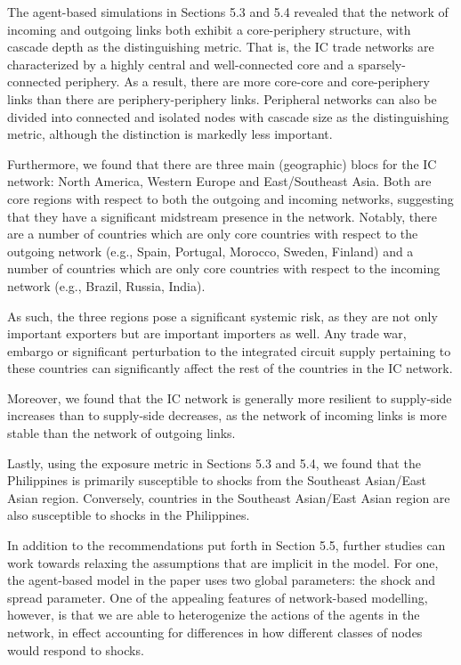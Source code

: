 \documentclass[12pt,letterpaper]{report}
\begin{document}
The agent-based simulations in Sections 5.3 and 5.4 revealed that the network of incoming and outgoing links both exhibit a core-periphery structure, with cascade depth as the distinguishing metric. That is, the IC trade networks are characterized by a highly central and well-connected core and a sparsely-connected periphery. As a result, there are more core-core and core-periphery links than there are periphery-periphery links. Peripheral networks can also be divided into connected and isolated nodes with cascade size as the distinguishing metric, although the distinction is markedly less important.

Furthermore, we found that there are three main (geographic) blocs for the IC network: North America, Western Europe and East/Southeast Asia. Both are core regions with respect to both the outgoing and incoming networks, suggesting that they have a significant midstream presence in the network. Notably, there are a number of countries which are only core countries with respect to the outgoing network (e.g., Spain, Portugal, Morocco, Sweden, Finland) and a number of countries which are only core countries with respect to the incoming network (e.g., Brazil, Russia, India).

As such, the three regions pose a significant systemic risk, as they are not only important exporters but are important importers as well. Any trade war, embargo or significant perturbation to the integrated circuit supply pertaining to these countries can significantly affect the rest of the countries in the IC network. 

Moreover, we found that the IC network is generally more resilient to supply-side increases than to supply-side decreases, as the network of incoming links is more stable than the network of outgoing links. 

Lastly, using the exposure metric in Sections 5.3 and 5.4, we found that the Philippines is primarily susceptible to shocks from the Southeast Asian/East Asian region. Conversely, countries in the Southeast Asian/East Asian region are also susceptible to shocks in the Philippines.

In addition to the recommendations put forth in Section 5.5, further studies can work towards relaxing the assumptions that are implicit in the model. For one, the agent-based model in the paper uses two global parameters: the shock and spread parameter. One of the appealing features of network-based modelling, however, is that we are able to heterogenize the actions of the agents in the network, in effect accounting for differences in how different classes of nodes would respond to shocks. 
\end{document}
